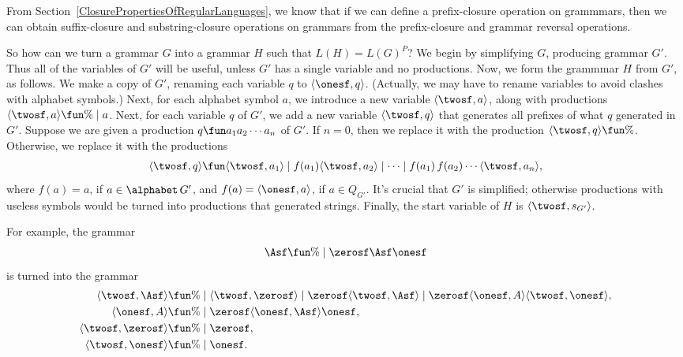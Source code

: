 From Section~\ref{ClosurePropertiesOfRegularLanguages},
we know that if we can define a prefix-closure operation
%
%
%
%
%
%
%
%
%
%
%
%
on grammmars, then we can obtain suffix-closure and substring-closure
operations on grammars from the prefix-closure and grammar reversal
operations.

So how can we turn a grammar $G$ into a grammar $H$ such that
$L(H)=L(G)^P$?
We begin by simplifying $G$, producing grammar $G'$.
Thus all of the variables of $G'$ will be useful, unless $G'$ has
a single variable and no productions.  Now, we form the grammmar $H$
from $G'$, as follows.
We make a copy of $G'$, renaming each variable $q$ to
$\langle\onesf,q\rangle$.  (Actually, we may have to rename variables
to avoid clashes with alphabet symbols.)
Next, for each alphabet symbol $a$, we introduce a new variable
$\langle\twosf,a\rangle$, along with productions
$\langle\twosf,a\rangle\fun\%\mid a$.
Next, for each variable $q$ of $G'$, we add a new variable
$\langle\twosf,q\rangle$ that generates all prefixes of what $q$
generated in $G'$.  Suppose we are given a production $q\fun
a_1a_2\cdots a_n$ of $G'$.  If $n=0$, then we replace it with the
production $\langle\twosf,q\rangle\fun\%$.  Otherwise, we replace it
with the productions
\begin{gather*}
\langle\twosf,q\rangle\fun
\langle\twosf,a_1\rangle \mid
f(a_1)\langle\twosf,a_2\rangle \mid \cdots \mid
f(a_1)\,f(a_2)\cdots\langle\twosf,a_n\rangle ,
\end{gather*}
where $f(a) = a$, if $a\in\alphabet\,G'$, and
$f(a)=\langle\onesf,a\rangle$, if $a\in Q_{G'}$.
It's crucial that $G'$ is simplified; otherwise productions with
useless symbols would be turned into productions that generated
strings.
Finally, the start variable of $H$ is $\langle\twosf,s_{G'}\rangle$.

For example, the grammar
\begin{gather*}
\Asf\fun \% \mid \zerosf\Asf\onesf
\end{gather*}
is turned into the grammar
\begin{align*}
\langle \twosf,\Asf\rangle &\fun \% \mid
  \langle\twosf,\zerosf\rangle \mid
  \zerosf\langle\twosf,\Asf\rangle \mid
  \zerosf\langle\onesf,A\rangle\langle\twosf,\onesf\rangle , \\
\langle\onesf,A\rangle &\fun \% \mid
  \zerosf\langle\onesf,\Asf\rangle\onesf , \\
\langle\twosf,\zerosf\rangle &\fun \% \mid \zerosf , \\
\langle\twosf,\onesf\rangle &\fun \% \mid \onesf .
\end{align*}

